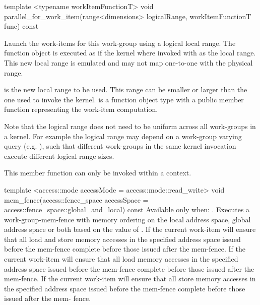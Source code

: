   \addRowThreeL
    {template <typename workItemFunctionT>}
    {void parallel_for_work_item(range<dimensions> }
    { logicalRange, workItemFunctionT func) const}
    {
      Launch the work-items for this work-group using a logical local range.
      The function object  is executed as if the kernel where
      invoked with  as the local range. This new local
      range is emulated and may not map one-to-one with the physical range.
      
       is the new local range to be used.
      This range can be smaller or larger than the one used to invoke the kernel.
       is a function object type with a public member function
      representing the work-item computation.

      Note that the logical range does not need to be uniform
      across all work-groups in a kernel.  For example the logical range may depend on
      a work-group varying query (e.g. ),
      such that different work-groups in the same kernel invocation execute
      different logical range sizes.

      This member function can only be invoked within a
       context.
    }
  \addRowFourL
    { template <access::mode accessMode = }
    { access::mode::read_write> }
    { void mem_fence(access::fence_space accessSpace = }
    { access::fence_space::global_and_local) const }
    {
      Available only when: .
      \newline
      Executes a \gls{work-group-mem-fence} with memory ordering on the local
      address space, global address space or both based on the value of
      . If  the current work-item will ensure that all load
      and store memory accesses in the specified address space issued before the
      mem-fence complete before those issued after the mem-fence. If
       the current work-item will
      ensure that all load memory accesses in the specified address space issued
      before the mem-fence complete before those issued after the mem-fence. If
       the current work-item will
      ensure that all store memory accesses in the specified address space
      issued before the mem-fence complete before those issued after the mem-
      fence.
    }
